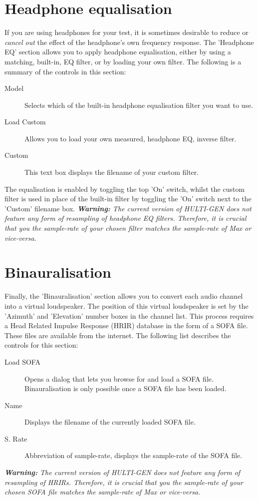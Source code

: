 \section{Headphone equalisation}
If you are using headphones for your test, it is sometimes desirable to reduce or \emph{cancel out} the effect of the headphone's own frequency response. The 'Headphone EQ' section allows you to apply headphone equalisation, either by using a matching, built-in, EQ filter, or by loading your own filter. The following is a summary of the controls in this section:
\begin{description}
	\item[Model] Selects which of the built-in headphone equalisation filter you want to use.
	\item[Load Custom] Allows you to load your own measured, headphone EQ, inverse filter.
	\item[Custom] This text box displays the filename of your custom filter. 
\end{description}
\noindent
The equalisation is enabled by toggling the top 'On' switch, whilst the custom filter is used in place of the built-in filter by toggling the 'On' switch next to the 'Custom' filename box.
\linebreak\linebreak
\noindent
\textit{\textbf{Warning:} The current version of HULTI-GEN does not feature any form of resampling of headphone EQ filters. Therefore, it is crucial that you the sample-rate of your chosen filter matches the sample-rate of Max or vice-versa.}

\section{Binauralisation}
Finally, the 'Binauralisation' section allows you to convert each audio channel into a virtual loudspeaker. The position of this virtual loudspeaker is set by the 'Azimuth' and 'Elevation' number boxes in the channel list. This process requires a Head Related Impulse Response (HRIR) database in the form of a SOFA file. These files are available from the internet. The following list describes the controls for this section:
\begin{description}
	\item[Load SOFA] Opens a dialog that lets you browse for and load a SOFA file. Binauralisation is only possible once a SOFA file has been loaded.
	\item[Name] Displays the filename of the currently loaded SOFA file.
	\item[S. Rate] Abbreviation of sample-rate, displays the sample-rate of the SOFA file.
\end{description}

\noindent
\textit{\textbf{Warning:} The current version of HULTI-GEN does not feature any form of resampling of HRIRs. Therefore, it is crucial that you the sample-rate of your chosen SOFA file matches the sample-rate of Max or vice-versa.}